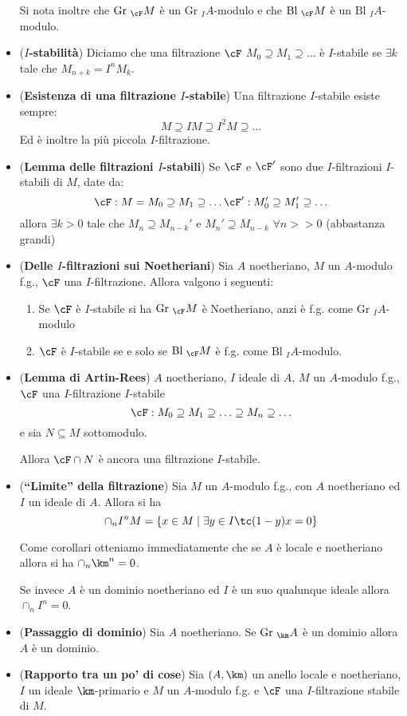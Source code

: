 \documentclass[a4paper,NoNotes,GeneralMath]{stdmdoc}
\newcommand{\Gr}{\text{Gr }}
\newcommand{\Bl}{\text{Bl }}
\begin{document}
\begin{itemize}
  Si nota inoltre che $\Gr_\cF M$ è un $\Gr_I A$-modulo e che $\Bl_\cF
  M$ è un $\Bl_I A$-modulo.
\item ({\bf $I$-stabilità}) Diciamo che una filtrazione $\cF$
  $M_0 \supseteq M_1 \supseteq \ldots$ è $I$-stabile se $\exists k$ tale
  che $M_{n + k} = I^n M_k$.
\item ({\bf Esistenza di una filtrazione $I$-stabile}) Una filtrazione
  $I$-stabile esiste sempre:
  $$ M \supseteq IM \supseteq I^2 M \supseteq \ldots $$
  Ed è inoltre la più piccola $I$-filtrazione.
\item ({\bf Lemma delle filtrazioni $I$-stabili}) Se $\cF$ e $\cF '$
  sono due $I$-filtrazioni $I$-stabili di $M$, date da:
  $$ \cF: M = M_0 \supseteq M_1 \supseteq \ldots  \hfill  \cF': M_0'
  \supseteq M_1' \supseteq \ldots $$ allora $\exists k > 0$ tale che
  $M_n \supseteq M_{n-k}'$ e $M_n' \supseteq M_{n-k}$ $\forall n >> 0$
  (abbastanza grandi)
\item ({\bf Delle $I$-filtrazioni sui Noetheriani}) Sia $A$ noetheriano,
  $M$ un $A$-modulo f.g., $\cF$ una $I$-filtrazione. Allora valgono i
  seguenti:
  \begin{enumerate}
  \item Se $\cF$ è $I$-stabile si ha $\Gr_\cF M$ è Noetheriano, anzi è
    f.g. come $\Gr_I A$-modulo
  \item $\cF$ è $I$-stabile se e solo se $\Bl_\cF M$ è f.g. come $\Bl_I
    A$-modulo.
  \end{enumerate}
\item ({\bf Lemma di Artin-Rees}) $A$ noetheriano, $I$ ideale di $A$,
  $M$ un $A$-modulo f.g., $\cF$ una $I$-filtrazione $I$-stabile
  $$ \cF: M_0 \supseteq M_1 \supseteq \ldots \supseteq M_n \supseteq
  \ldots $$ e sia $N \subseteq M$ sottomodulo.

  Allora $\cF \cap N$ è ancora una filtrazione $I$-stabile.
\item ({\bf ``Limite'' della filtrazione}) Sia $M$ un $A$-modulo f.g.,
  con $A$ noetheriano ed $I$ un ideale di $A$. Allora si ha
  $$ \cap_n I^n M = \{ x \in M \mid \exists y \in I \tc (1 - y)x = 0
  \} $$

  Come corollari otteniamo immediatamente che se $A$ è locale e
  noetheriano allora si ha $\cap_n \km^n = 0$.

  Se invece $A$ è un dominio noetheriano ed $I$ è un suo qualunque
  ideale allora $\cap_n I^n = 0$.
\item ({\bf Passaggio di dominio}) Sia $A$ noetheriano. Se $\Gr_\km A$ è
  un dominio allora $A$ è un dominio.
\item ({\bf Rapporto tra un po' di cose}) Sia $(A, \km)$ un anello
  locale e noetheriano, $I$ un ideale $\km$-primario e $M$ un $A$-modulo
  f.g. e $\cF$ una $I$-filtrazione stabile di $M$.


\end{itemize}
\end{document}
